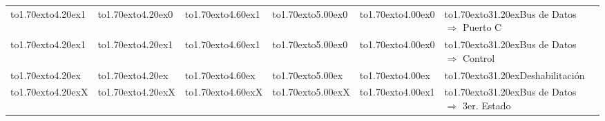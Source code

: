 \begin{table}[!htb]
\begin{tabular}{|l|l|l|l|l|l|}
\cline{1-6}
\vbox to1.70ex{\vspace{1pt}\vfil\hbox to4.20ex{\hfil 1\hfil}\vfil} & 
\vbox to1.70ex{\vspace{1pt}\vfil\hbox to4.20ex{\hfil 0\hfil}\vfil} & 
\vbox to1.70ex{\vspace{1pt}\vfil\hbox to4.60ex{\hfil 1\hfil}\vfil} & 
\vbox to1.70ex{\vspace{1pt}\vfil\hbox to5.00ex{\hfil 0\hfil}\vfil} & 
\vbox to1.70ex{\vspace{1pt}\vfil\hbox to4.00ex{\hfil 0\hfil}\vfil} & 
\vbox to1.70ex{\vspace{1pt}\vfil\hbox to31.20ex{\hfil Bus de Datos $\Longrightarrow$ %
Puerto C\hfil}\vfil} \\

\cline{1-6}
\vbox to1.70ex{\vspace{1pt}\vfil\hbox to4.20ex{\hfil 1\hfil}\vfil} & 
\vbox to1.70ex{\vspace{1pt}\vfil\hbox to4.20ex{\hfil 1\hfil}\vfil} & 
\vbox to1.70ex{\vspace{1pt}\vfil\hbox to4.60ex{\hfil 1\hfil}\vfil} & 
\vbox to1.70ex{\vspace{1pt}\vfil\hbox to5.00ex{\hfil 0\hfil}\vfil} & 
\vbox to1.70ex{\vspace{1pt}\vfil\hbox to4.00ex{\hfil 0\hfil}\vfil} & 
\vbox to1.70ex{\vspace{1pt}\vfil\hbox to31.20ex{\hfil Bus de Datos $\Longrightarrow$ %
Control\hfil}\vfil} \\

\cline{1-6}
\vbox to1.70ex{\vspace{1pt}\vfil\hbox to4.20ex{\hfil \hfil}\vfil} & 
\vbox to1.70ex{\vspace{1pt}\vfil\hbox to4.20ex{\hfil \hfil}\vfil} & 
\vbox to1.70ex{\vspace{1pt}\vfil\hbox to4.60ex{\hfil \hfil}\vfil} & 
\vbox to1.70ex{\vspace{1pt}\vfil\hbox to5.00ex{\hfil \hfil}\vfil} & 
\vbox to1.70ex{\vspace{1pt}\vfil\hbox to4.00ex{\hfil \hfil}\vfil} & 
\vbox to1.70ex{\vspace{1pt}\vfil\hbox to31.20ex{\hfil Deshabilitaci\'on\hfil}\vfil} %
\\

\cline{1-6}
\vbox to1.70ex{\vspace{1pt}\vfil\hbox to4.20ex{\hfil X\hfil}\vfil} & 
\vbox to1.70ex{\vspace{1pt}\vfil\hbox to4.20ex{\hfil X\hfil}\vfil} & 
\vbox to1.70ex{\vspace{1pt}\vfil\hbox to4.60ex{\hfil X\hfil}\vfil} & 
\vbox to1.70ex{\vspace{1pt}\vfil\hbox to5.00ex{\hfil X\hfil}\vfil} & 
\vbox to1.70ex{\vspace{1pt}\vfil\hbox to4.00ex{\hfil 1\hfil}\vfil} & 
\vbox to1.70ex{\vspace{1pt}\vfil\hbox to31.20ex{\hfil Bus de Datos $\Longrightarrow$ %
3er. Estado\hfil}\vfil} \\


\end{tabular}
\end{table}
